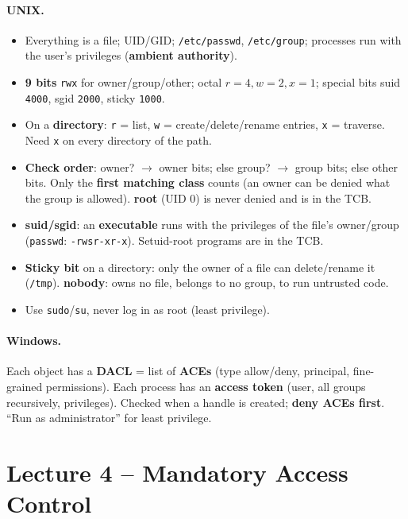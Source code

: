 \paragraph{UNIX.}
\begin{itemize}
    \item Everything is a file; UID/GID; \texttt{/etc/passwd}, \texttt{/etc/group}; processes run with the user's privileges (\textbf{ambient authority}).
    \item \textbf{9 bits} \texttt{rwx} for owner/group/other; octal $r=4, w=2, x=1$; special bits suid \texttt{4000}, sgid \texttt{2000}, sticky \texttt{1000}.
    \item On a \textbf{directory}: \texttt{r} = list, \texttt{w} = create/delete/rename entries, \texttt{x} = traverse. Need \texttt{x} on every directory of the path.
    \item \textbf{Check order}: owner? $\to$ owner bits; else group? $\to$ group bits; else other bits. Only the \textbf{first matching class} counts (an owner can be denied what the group is allowed). \textbf{root} (UID 0) is never denied and is in the TCB.
    \item \textbf{suid/sgid}: an \textbf{executable} runs with the privileges of the file's owner/group (\texttt{passwd}: \texttt{-rwsr-xr-x}). Setuid-root programs are in the TCB.
    \item \textbf{Sticky bit} on a directory: only the owner of a file can delete/rename it (\texttt{/tmp}). \textbf{nobody}: owns no file, belongs to no group, to run untrusted code.
    \item Use \texttt{sudo}/\texttt{su}, never log in as root (least privilege).
\end{itemize}

\paragraph{Windows.} Each object has a \textbf{DACL} = list of \textbf{ACEs} (type allow/deny, principal, fine-grained permissions). Each process has an \textbf{access token} (user, all groups recursively, privileges). Checked when a handle is created; \textbf{deny ACEs first}. ``Run as administrator'' for least privilege.

\section{Lecture 4 -- Mandatory Access Control}

